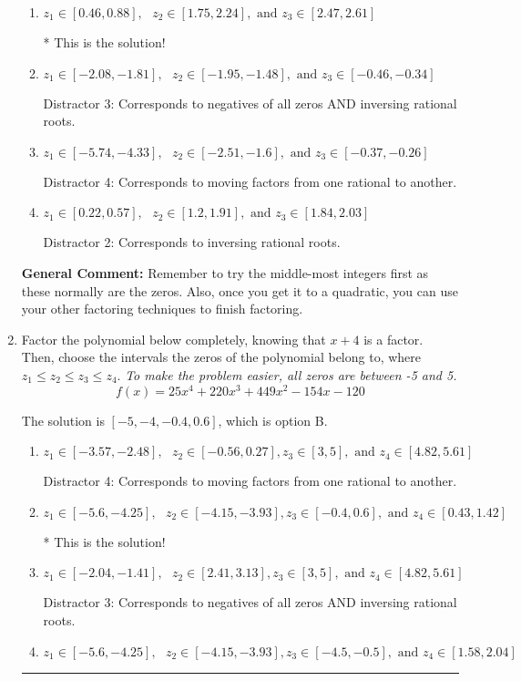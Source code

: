 \documentclass{extbook}[14pt]
\newcommand{\litem}[1]{\item #1

\rule{\textwidth}{0.4pt}}
\begin{document}
\begin{enumerate}
{\begin{enumerate}[label=\Alph*.]
 Distractor 1: Corresponds to negatives of all zeros.
\item \( z_1 \in [0.46, 0.88], \text{   }  z_2 \in [1.75, 2.24], \text{   and   } z_3 \in [2.47, 2.61] \)

* This is the solution!
\item \( z_1 \in [-2.08, -1.81], \text{   }  z_2 \in [-1.95, -1.48], \text{   and   } z_3 \in [-0.46, -0.34] \)

 Distractor 3: Corresponds to negatives of all zeros AND inversing rational roots.
\item \( z_1 \in [-5.74, -4.33], \text{   }  z_2 \in [-2.51, -1.6], \text{   and   } z_3 \in [-0.37, -0.26] \)

 Distractor 4: Corresponds to moving factors from one rational to another.
\item \( z_1 \in [0.22, 0.57], \text{   }  z_2 \in [1.2, 1.91], \text{   and   } z_3 \in [1.84, 2.03] \)

 Distractor 2: Corresponds to inversing rational roots.
\end{enumerate}

\textbf{General Comment:} Remember to try the middle-most integers first as these normally are the zeros. Also, once you get it to a quadratic, you can use your other factoring techniques to finish factoring.
}
\litem{
Factor the polynomial below completely, knowing that $x+4$ is a factor. Then, choose the intervals the zeros of the polynomial belong to, where $z_1 \leq z_2 \leq z_3 \leq z_4$. \textit{To make the problem easier, all zeros are between -5 and 5.}
\[ f(x) = 25x^{4} +220 x^{3} +449 x^{2} -154 x -120 \]

The solution is \( [-5, -4, -0.4, 0.6] \), which is option B.\begin{enumerate}[label=\Alph*.]
\item \( z_1 \in [-3.57, -2.48], \text{   }  z_2 \in [-0.56, 0.27], z_3 \in [3, 5], \text{   and   } z_4 \in [4.82, 5.61] \)

 Distractor 4: Corresponds to moving factors from one rational to another.
\item \( z_1 \in [-5.6, -4.25], \text{   }  z_2 \in [-4.15, -3.93], z_3 \in [-0.4, 0.6], \text{   and   } z_4 \in [0.43, 1.42] \)

* This is the solution!
\item \( z_1 \in [-2.04, -1.41], \text{   }  z_2 \in [2.41, 3.13], z_3 \in [3, 5], \text{   and   } z_4 \in [4.82, 5.61] \)

 Distractor 3: Corresponds to negatives of all zeros AND inversing rational roots.
\item \( z_1 \in [-5.6, -4.25], \text{   }  z_2 \in [-4.15, -3.93], z_3 \in [-4.5, -0.5], \text{   and   } z_4 \in [1.58, 2.04] \)


\end{enumerate}}
\end{enumerate}
\end{document}
